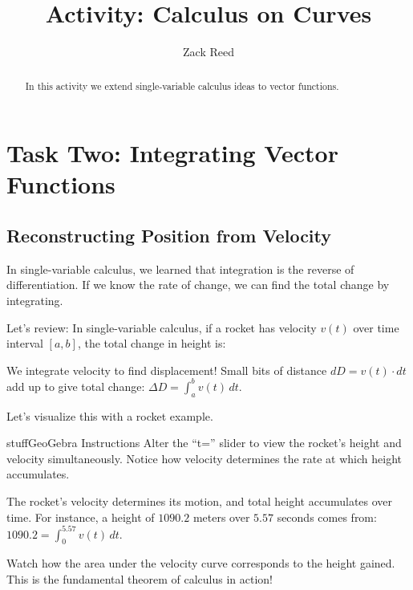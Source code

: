 \documentclass{ximera}
\title{Activity: Calculus on Curves}
\author{Zack Reed}
\begin{document}
\begin{abstract}
In this activity we extend single-variable calculus ideas to vector functions.
\end{abstract}
\maketitle

\section*{Task Two: Integrating Vector Functions}

\subsection*{Reconstructing Position from Velocity}

In single-variable calculus, we learned that integration is the reverse of differentiation. If we know the rate of change, we can find the total change by integrating.

\begin{problem}
Let's review: In single-variable calculus, if a rocket has velocity $v(t)$ over time interval $[a,b]$, the total change in height is:

\begin{multipleChoice}
\end{multipleChoice}

\begin{feedback}
We integrate velocity to find displacement! Small bits of distance $dD = v(t) \cdot dt$ add up to give total change: $\Delta D = \int_a^b v(t) \, dt$.
\end{feedback}
\end{problem}

\begin{problem}
Let's visualize this with a rocket example.

\begin{expandable}{stuff}{GeoGebra Instructions}
    Alter the ``t='' slider to view the rocket's height and velocity simultaneously. Notice how velocity determines the rate at which height accumulates.
\end{expandable}

\begin{center}
\end{center}

The rocket's velocity determines its motion, and total height accumulates over time. For instance, a height of $1090.2$ meters over $5.57$ seconds comes from: $1090.2 = \int_0^{5.57} v(t) \, dt$.

\begin{feedback}
Watch how the area under the velocity curve corresponds to the height gained. This is the fundamental theorem of calculus in action!
\end{feedback}
\end{problem}
\end{document}
